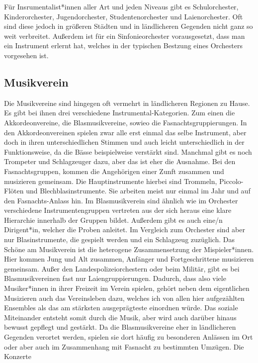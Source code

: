 Für Insrumentalist*innen aller Art und jeden Niveaus gibt es Schulorchester,
Kinderorchester, Jugendorchester, Studentenorchester und Laienorchester. Oft
sind diese jedoch in größeren Städten und in ländlicheren Gegenden nicht ganz so
weit verbreitet. Außerdem ist für ein Sinfonieorchester vorausgesetzt, dass man
ein Instrument erlernt hat, welches in der typischen Bestzung eines Orchesters
vorgesehen ist. 

\subsection{Musikverein}
Die Musikvereine sind hingegen oft vermehrt in ländlicheren Regionen zu Hause.
Es gibt bei ihnen drei verschiedene Instrumental-Kategorien. Zum einen die Akkordeonvereine, die
Blasmusikvereine, sowieo die Fasnachtsgruppierungen. In den Akkordeonvereinen
spielen zwar alle erst einmal das selbe Instrument, aber doch in ihren
unterschiedlichen Stimmen und auch leicht unterschiedlich in der Funktionsweise,
da die Bässe beispielweise verstärkt sind. Manchmal gibt es noch Trompeter und
Schlagzeuger dazu, aber das ist eher die Ausnahme. Bei den Fasnachtsgruppen,
kommen die Angehörigen einer Zunft zusammen und musizieren gemeinsam. Die
Hauptinstrumente hierbei sind Trommeln, Piccolo-Flöten und Blechblasinstrumente.
Sie arbeiten meist nur einmal im Jahr und auf den Fasnachts-Anlass hin. Im Blasmusikverein sind
ähnlich wie im Orchester verschiedene Instrumentengruppen vertreten aus der sich
heraus eine klare Hierarchie innerhalb der Gruppen bildet. Außerdem gibt es auch
eine/n
Dirigent*in, welcher die Proben anleitet. Im Vergleich zum Orchester sind aber
nur Blasinstrumente, die gespielt werden und ein Schlagzeug zuzüglich. Das
Schöne am Musikverein ist die heterogene Zusammensetzung der Mispieler*innen.
Hier kommen Jung und Alt zusammen, Anfänger und Fortgeschrittene musizieren
gemeinsam. Außer den Landespolizeiorchestern oder beim Militär, gibt es bei
Blasmusikvereinen fast nur Laiengruppierungen. Dadurch, dass also viele
Musiker*innen in ihrer Freizeit im Verein spielen, gehört neben dem eigentlichen
Musizieren auch das Vereinsleben dazu, welches ich von allen hier aufgezählten
Ensembles als das am stärksten ausgeprägteste einordnen würde. Das soziale
Miteinander entsteht somit durch die Musik, aber wird auch darüber hinaus
bewusst gepflegt und gestärkt. Da die Blasmusikvereine eher in ländlicheren
Gegenden verortet werden, spielen sie dort häufig zu besonderen Anlässen im Ort
oder aber auch im Zusammenhang mit Fasnacht zu bestimmten Umzügen. Die Konzerte
